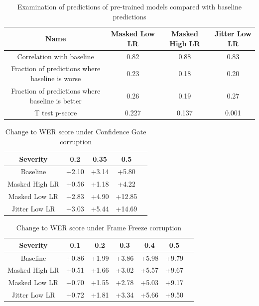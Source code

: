 \documentclass{article}
\begin{document}
\begin{table}[htbp]
\centering
\begin{tabular}{|c||c|c|c|}
\hline
Name  & Masked Low LR  &  Masked High LR & Jitter Low LR \\
\hline
\hline
 Correlation with baseline & 0.82 &  0.88 & 0.83 \\
 \hline
 Fraction of predictions where baseline is worse  & 0.23 &  0.18 & 0.20 \\
 \hline
  Fraction of predictions where baseline is better & 0.26 &  0.19 & 0.27 \\
 \hline
 T test p-score & 0.227 &  0.137 & 0.001 \\
\hline
\end{tabular}
\caption{Examination of predictions of pre-trained models compared with baseline predictions}
 \label{tab:fine-tune-preds}
\end{table}

\begin{table}[htbp]
\centering
\begin{tabular}{|c||c|c|c|c|}
\hline
Severity & 0.2 & 0.35 & 0.5 \\
\hline
\hline
Baseline & +2.10 & +3.14 & +5.80 \\
\hline
Masked High LR & +0.56 & +1.18 & +4.22 \\
\hline
Masked Low LR & +2.83 & +4.90 & +12.85 \\
\hline
Jitter Low LR & +3.03 & +5.44 & +14.69 \\
\hline
\end{tabular}
\caption{Change to WER score under Confidence Gate corruption }
 \label{tab:conf-corruption}
\end{table}

\begin{table}[htbp]
\centering
\begin{tabular}{|c||c|c|c|c|c|c|}
\hline
Severity & 0.1 & 0.2 & 0.3 & 0.4 & 0.5 \\
\hline
\hline
Baseline & +0.86 & +1.99 & +3.86 & +5.98 & +9.79 \\
\hline
Masked High LR & +0.51 & +1.66 & +3.02 & +5.57 & +9.67 \\
\hline
Masked Low LR & +0.70 & +1.55 & +2.78 & +5.03 & +9.17 \\
\hline
Jitter Low LR & +0.72 & +1.81 & +3.34 & +5.66 & +9.50 \\
\hline
\end{tabular}
\caption{Change to WER score under Frame Freeze corruption }
 \label{tab:freeze-corruption}
\end{table}
\end{document}
